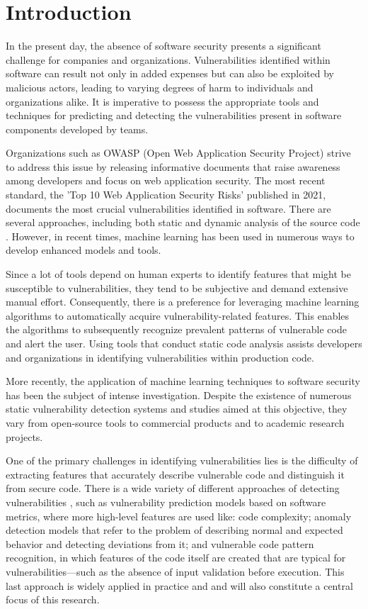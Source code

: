 
% 
%  
%
\chapter{Introduction}
\label{cha:introduction_chapter}

In the present day, the absence of software security presents a significant challenge for companies and organizations. Vulnerabilities identified within software can result not only in added expenses but can also be exploited by malicious actors, leading to varying degrees of harm to individuals and organizations alike. It is imperative to possess the appropriate tools and techniques for predicting and detecting the vulnerabilities present in software components developed by teams.

Organizations such as OWASP (Open Web Application Security Project) strive to address this issue by releasing informative documents that raise awareness among developers and focus on web application security. The most recent standard, the 'Top 10 Web Application Security Risks' published in 2021, documents the most crucial vulnerabilities identified in software.
There are several approaches, including both static and dynamic analysis of the source code \cite{Dejan_Baca_2015}. However, in recent times, machine learning has been used in numerous ways to develop enhanced models and tools.

Since a lot of tools depend on human experts to identify features that might be susceptible to vulnerabilities, they tend to be subjective and demand extensive manual effort. Consequently, there is a preference for leveraging machine learning algorithms to automatically acquire vulnerability-related features. This enables the algorithms to subsequently recognize prevalent patterns of vulnerable code and alert the user.
Using tools that conduct static code analysis assists developers and organizations in identifying vulnerabilities within production code.
\newpage

More recently, the application of machine learning techniques to software security has been the subject of intense investigation. Despite the existence of numerous static vulnerability detection systems and studies aimed at this objective, they vary from open-source tools to commercial products and to academic research projects.

One of the primary challenges in identifying vulnerabilities lies is the difficulty of extracting features that accurately describe vulnerable code and distinguish it from secure code. There is a wide variety of different approaches of detecting vulnerabilities \cite{Seyed_Hamid_2022}, such as vulnerability prediction models based on software metrics, where more high-level features are used like: code complexity; anomaly detection models that refer to the problem of describing normal and expected behavior and detecting deviations from it; and vulnerable code pattern recognition, in which features of the code itself are created that are typical for vulnerabilities—such as the absence of input validation before execution. This last approach is widely applied in practice and and will also constitute a central focus of this research.     

